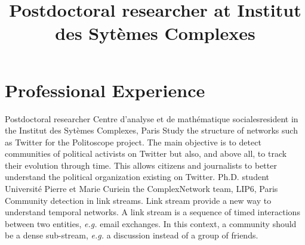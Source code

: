 \documentclass[11pt,a4paper]{moderncv}
\title{Postdoctoral researcher at Institut des Sytèmes Complexes }
\begin{document}
\maketitle
\vspace{-1.2cm}

\section{Professional Experience}
 {Postdoctoral researcher} {Centre d’analyse et de mathématique sociales}{}{resident in the Institut des Sytèmes Complexes, Paris}
{
	Study the structure of networks such as Twitter for the Politoscope project. The main objective is to detect communities of political activists on Twitter but also, and above all, to track their evolution through time. This allows citizens and journalists to better understand the political organization existing on Twitter.
}
\vspace*{0.2cm}
 {Ph.D. student} {Université Pierre et Marie Curie}{}{in the ComplexNetwork team, LIP6, Paris}
{
Community detection in link streams. Link stream provide a new way to understand temporal networks.
A link stream is a sequence of timed interactions between two entities, \emph{e.g.} email exchanges.
In this context, a community should be a dense sub-stream, \emph{e.g.} a discussion instead of a group of
friends.
}
\vspace*{0.2cm}
%
\vspace*{0.2cm}


\end{document}
